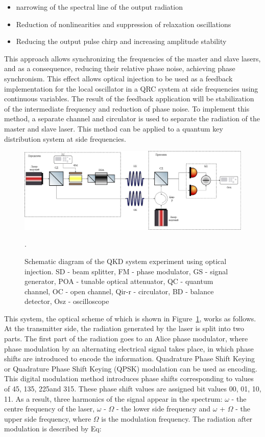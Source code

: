 {\begin{itemize}
    \item narrowing of the spectral line of the output radiation
    \item Reduction of nonlinearities and suppression of relaxation oscillations
    \item Reducing the output pulse chirp and increasing amplitude stability
\end{itemize}
This approach allows synchronizing the frequencies of the master and slave lasers, and as a consequence, reducing their relative phase noise, achieving phase synchronism. This effect allows optical injection to be used as a feedback implementation for the local oscillator in a QRC system at side frequencies using continuous variables. The result of the feedback application will be stabilization of the intermediate frequency and reduction of phase noise. To implement this method, a separate channel and circulator is used to separate the radiation of the master and slave laser. 
This method can be applied to a quantum key distribution system at side frequencies.
\begin{figure}
    \centering
    \includegraphics[width=\textwidth]{images/Схема с обратной связью.png}
    \caption{Schematic diagram of the QKD system experiment using optical injection. SD - beam splitter, FM - phase modulator, GS - signal generator, POA - tunable optical attenuator, QC - quantum channel, OC - open channel, Qir-r - circulator, BD - balance detector, Osz - oscilloscope}.
    \label{fig:opt inj scheme syn}
\end{figure}
This system, the optical scheme of which is shown in Figure~\ref{fig:opt inj scheme syn}, works as follows. At the transmitter side, the radiation generated by the laser is split into two parts. The first part of the radiation goes to an Alice phase modulator, where phase modulation by an alternating electrical signal takes place, in which phase shifts are introduced to encode the information. Quadrature Phase Shift Keying or Quadrature Phase Shift Keying (QPSK) modulation can be used as encoding. This digital modulation method introduces phase shifts corresponding to values of 45\textdegree, 135\textdegree, 225\textdegree and 315\textdegree. These phase shift values are assigned bit values {00, 01, 10, 11}. As a result, three harmonics of the signal appear in the spectrum: $\omega$ - the centre frequency of the laser, $\omega$ - $\Omega$ - the lower side frequency and $\omega$ + $\Omega$ - the upper side frequency, where $\Omega$ is the modulation frequency. The radiation after modulation is described by Eq:
}
